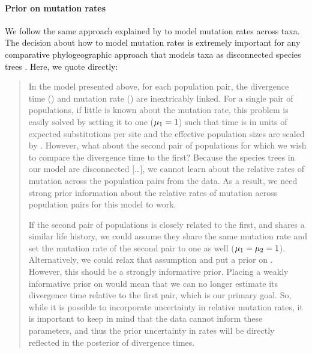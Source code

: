 \begin{linenomath}
\paragraph{Prior on mutation rates}
We follow the same approach explained by \citet{Oaks2018ecoevolity} to model
mutation rates across taxa.
The decision about how to model mutation rates is extremely important for any
comparative phylogeographic approach that models taxa as disconnected
species trees
\citep[\fig{}~\ref{fig:divCartoon}; e.g.,][]{Hickerson2006,Hickerson2007,Huang2011,Chan2014,Oaks2014dpp,Xue2015,Burbrink2016,Xue2017,Gehara2017,Oaks2018ecoevolity}.
Here, we quote \citet{Oaks2018ecoevolity} directly:
\begin{quotation}
In the model presented above, for each population pair, the divergence time
(\divtime) and mutation rate (\murate) are inextricably linked.
For a single pair of populations, if little is known about the mutation rate,
this problem is easily solved by setting it to one ($\murate[1] = 1$) such
that time is in units of expected substitutions per site and the effective
population sizes are scaled by \murate.
However, what about the second pair of populations for which we wish to compare
the divergence time to the first?
Because the species trees in our model are disconnected
[\ldots],
we cannot learn about
the relative rates of mutation across the population pairs from the data.
As a result, we need strong prior information about the relative rates of
mutation across population pairs for this model to work.

If the second pair of populations is closely related to the first, and shares a
similar life history, we could assume they share the same mutation rate and
set the mutation rate of the second pair to one as well ($\murate[1] = \murate[2] = 1$).
Alternatively, we could relax that assumption and put a prior on \murate[2].
However, this should be a strongly informative prior.
Placing a weakly informative prior on \murate[2] would mean that we can no
longer estimate its divergence time relative to the first pair,
which is our primary goal.
So, while it is possible to incorporate uncertainty in relative mutation rates,
it is important to keep in mind that the data cannot inform these parameters,
and thus the prior uncertainty in rates will be directly reflected in the
posterior of divergence times.
\end{quotation}


\end{linenomath}

